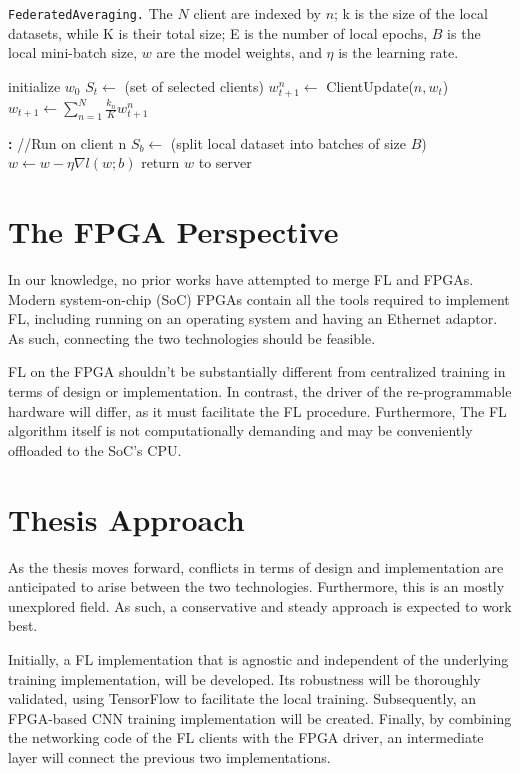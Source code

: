 \begin{algorithm}[H]
    \caption[FederatedAveraging]{\texttt{FederatedAveraging.} The \(N\) client are indexed by \(n\); k is the size of the local datasets, while K is their total size; E is the number of local epochs, \(B\) is the local mini-batch size, \(w\) are the model weights, and \(\eta\) is the learning rate.}
    \label{alg:FederatedAveraging}
    \begin{algorithmic}
            \State initialize $w_0$
                \State $S_{t} \gets$ (set of selected clients)
                    \State $w_{t+1}^n \gets$ ClientUpdate($n,w_t$)
                \EndFor
                \State $w_{t+1} \gets \sum_{n=1}^{N} \frac{k_n}{K} w_{t+1}^n$
            \EndFor
        \EndFunction
        
        \textbf{:} //Run on client n
            \State $S_b \gets $ (split local dataset into batches of size $B$)
                    \State $w \gets w - \eta \nabla l(w;b)$
                \EndFor
            \EndFor
            \State return $w$ to server
        \EndFunction
    \end{algorithmic}
\end{algorithm}


\section{The FPGA Perspective}
In our knowledge, no prior works have attempted to merge FL and FPGAs. Modern system-on-chip (SoC) FPGAs contain all the tools required to implement FL, including running on an operating system and having an Ethernet adaptor. As such, connecting the two technologies should be feasible.

FL on the FPGA shouldn't be substantially different from centralized training in terms of design or implementation. In contrast, the driver of the re-programmable hardware will differ, as it must facilitate the FL procedure. Furthermore, The FL algorithm itself is not computationally demanding and may be conveniently offloaded to the SoC's CPU.

\section{Thesis Approach}
As the thesis moves forward, conflicts in terms of design and implementation are anticipated to arise between the two technologies. Furthermore, this is an mostly unexplored field. As such, a conservative and steady approach is expected to work best. 

Initially, a FL implementation that is agnostic and independent of the underlying training implementation, will be developed. Its robustness will be thoroughly validated, using TensorFlow to facilitate the local training. Subsequently, an FPGA-based CNN training implementation will be created. Finally, by combining the networking code of the FL clients with the FPGA driver,
an intermediate layer will connect the previous two implementations.
